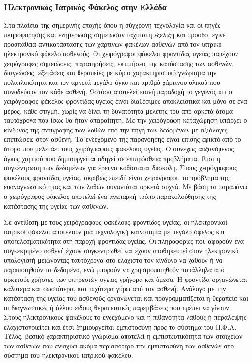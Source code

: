 \subsubsection{Ηλεκτρονικός Ιατρικός Φάκελος στην Ελλάδα}
Στα πλαίσια της σημερινής εποχής όπου η σύγχρονη τεχνολογία και οι πηγές πληροφόρησης και ενημέρωσης σημείωσαν ταχύτατη εξέλιξη και πρόοδο, έγινε προσπάθεια αντικατάστασης των χάρτινων φακέλων ασθενών από τον ιατρικό ηλεκτρονικό φάκελο ασθενούς. Οι χειρόγραφοι φάκελοι φροντίδας υγείας παρέχουν χειρόγραφες σημειώσεις, παρατηρήσεις, εκτιμήσεις της κατάστασης των ασθενών, διαγνώσεις, εξετάσεις και θεραπείες με κύριο χαρακτηριστικό γνώρισμα την πολυπλοκότητα και τον αρκετά μεγάλο όγκο και αριθμό χάρτινου υλικού που συνοδεύουν τον κάθε ασθενή.
 Ωστόσο αποτελεί κοινή παραδοχή το γεγονός ότι ο χειρόγραφος φάκελος φροντίδας υγείας είναι διαθέσιμος αποκλειστικά και μόνο σε ένα μέρος, κάθε στιγμή, χωρίς να δίνει τη δυνατότητα μελέτης του από αρκετά άτομα ταυτόχρονα που ίσως θα ήταν απαραίτητη. Με την χειρόγραφη καταχώρηση υπάρχει ο κίνδυνος της αντιγραφής των λαθών από την πηγή των δεδομένων με αξιόλογες επιπτώσεις στον ασθενή. Το ενδεχόμενο της παρανόησης είναι επίσης εφικτό από το άτομο που μελετάει τους χειρόγραφους φακέλους υγείας. Ο συνεχώς αυξανόμενος όγκος χαρτιού που δημιουργείται οδηγεί σε επιπρόσθετα προβλήματα. Έτσι η συγκέντρωση των δεδομένων για έρευνα καθίσταται δύσκολη. Στους χειρόγραφους φακέλους φροντίδας υγείας, ακριβώς επειδή είναι χειρόγραφοι, το πρόβλημα της ευαναγνωστικότητας και των λαθών συναντάται αρκετά συχνά. Με βάση τα παραπάνω ο χειρόγραφος φάκελος αποτελεί ένα ανεπαρκή τρόπο παρακολούθησης της κατάστασης της υγείας των ασθενών.

 Σε αντίθεση με τους χειρόγραφους φακέλους φροντίδας υγείας, οι ηλεκτρονικοί ιατρικοί φάκελοι αποτελούν μια τεχνολογική καινοτομία με μεγάλο όφελος και αποτελεσματικότητα στη παροχή φροντίδας υγείας. Οι πληροφορίες που αφορούν ένα συγκεκριμένο ασθενή έχουν συγκεντρωθεί και έχουν
αποθηκευτεί στον ηλεκτρονικό υπολογιστή μειώνοντας ταυτόχρονα στο ελάχιστο τον κίνδυνο να χαθούν ή να παραποιηθούν τα δεδομένα, ενώ μπορούν να χρησιμοποιηθούν παράλληλα από αρκετούς χρήστες των υπηρεσιών υγείας γρήγορα και άμεσα. Η φροντίδα οργανώνεται καλύτερα και σωστότερα, και ταχύτερα γύρω από τον ασθενή. Ανάλογα με την κατάσταση της υγείας του ασθενούς οργανώνεται και προγραμματίζεται η θεραπεία και οι διαγνωστικές ή άλλου είδους θεραπευτικές παρεμβάσεις που πρέπει να γίνουν. Στους ηλεκτρονικούς φακέλους το ενδεχόμενο και η πιθανότητα λάθους ή παράλειψης ελαχιστοποιείται και έτσι δημιουργείται εμπιστοσύνη προς το σύστημα του Η.Φ.Α. Τέλος, βασικό χαρακτηριστικό γνώρισμα αποτελεί η εμπιστευτικότητα των στοιχείων των ασθενών που ενισχύει ακόμα περισσότερο την εμπιστοσύνη των ασθενών στο σύστημα του ηλεκτρονικού ιατρικού φακέλου.
 
